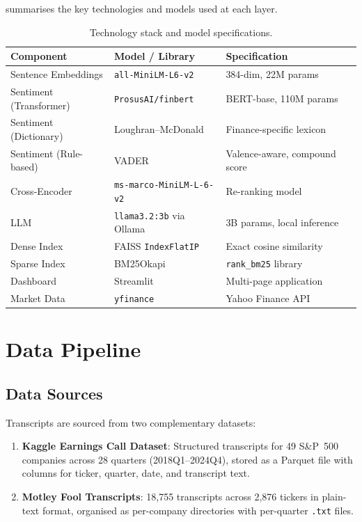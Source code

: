 \documentclass[12pt,a4paper]{article}
\begin{document}
 summarises the key technologies and models used at each layer.

\begin{table}[H]
\centering
\caption{Technology stack and model specifications.}
\label{tab:tech-stack}
\small
\begin{tabular}{@{}llll@{}}
\toprule
\textbf{Component} & \textbf{Model / Library} & \textbf{Specification} \\
\midrule
Sentence Embeddings & \texttt{all-MiniLM-L6-v2} & 384-dim, 22M params \\
Sentiment (Transformer) & \texttt{ProsusAI/finbert} & BERT-base, 110M params \\
Sentiment (Dictionary) & Loughran--McDonald & Finance-specific lexicon \\
Sentiment (Rule-based) & VADER & Valence-aware, compound score \\
Cross-Encoder & \texttt{ms-marco-MiniLM-L-6-v2} & Re-ranking model \\
LLM & \texttt{llama3.2:3b} via Ollama & 3B params, local inference \\
Dense Index & FAISS \texttt{IndexFlatIP} & Exact cosine similarity \\
Sparse Index & BM25Okapi & \texttt{rank\_bm25} library \\
Dashboard & Streamlit & Multi-page application \\
Market Data & \texttt{yfinance} & Yahoo Finance API \\
\bottomrule
\end{tabular}
\end{table}


\section{Data Pipeline}
\label{sec:data-pipeline}

\subsection{Data Sources}

Transcripts are sourced from two complementary datasets:

\begin{enumerate}[noitemsep]
    \item \textbf{Kaggle Earnings Call Dataset}: Structured transcripts for 49 S\&P~500 companies across 28 quarters (2018Q1--2024Q4), stored as a Parquet file with columns for ticker, quarter, date, and transcript text.
    \item \textbf{Motley Fool Transcripts}: 18,755 transcripts across 2,876 tickers in plain-text format, organised as per-company directories with per-quarter \texttt{.txt} files.
\end{enumerate}
\end{document}

